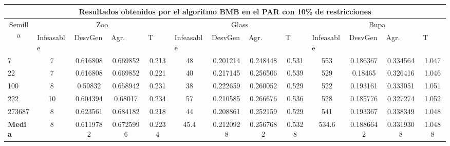 \begin{table}[H]
	\tiny

	\begin{adjustwidth}{-1cm}{-1cm}%
	
	\begin{tabular}{|l|c|c|c|c|c|c|c|c|c|c|c|c|}
	\hline
	\multicolumn{13}{|c|}{\textbf{Resultados obtenidos por el algoritmo BMB en el PAR con 10\% de restricciones}}                                                                                                                                                                                                                                                                                                                                            \\ \hline
	\multicolumn{1}{|c|}{\multirow{2}{*}{Semilla}} & \multicolumn{4}{c|}{Zoo}                                                                                          & \multicolumn{4}{c|}{Glass}                                                                                         & \multicolumn{4}{c|}{Bupa}                                                                                          \\ \cline{2-13} 
	\multicolumn{1}{|c|}{}                                  & \multicolumn{1}{l|}{Infeasable} & \multicolumn{1}{l|}{DesvGen} & \multicolumn{1}{l|}{Agr.} & \multicolumn{1}{l|}{T} & \multicolumn{1}{l|}{Infeasable} & \multicolumn{1}{l|}{DesvGen} & \multicolumn{1}{l|}{Agr.} & \multicolumn{1}{l|}{T} & \multicolumn{1}{l|}{Infeasable} & \multicolumn{1}{l|}{DesvGen} & \multicolumn{1}{l|}{Agr.} & \multicolumn{1}{l|}{T} \\ \hline
	7   	& 7 & 0.616808 & 0.669852 & 0.213 & 				48 & 0.201214 & 0.248448 & 0.531 &			 	553 & 0.186367 & 0.334564 & 1.047		\\ \hline
	22 		& 7 & 0.616808 & 0.669852 & 0.221 &				40 & 0.217145 & 0.256506 & 0.539 &		 		529 & 0.18465 & 0.326416 & 1.046		\\ \hline
	100 	& 8 & 0.59832 & 0.658942 & 0.231 &				38 & 0.222659 & 0.260052 & 0.529 &				522 & 0.193161 & 0.333051 & 1.051			\\ \hline
	222 	& 10 & 0.604394 & 0.68017 & 0.234 &				57 & 0.210585 & 0.266676 & 0.536 &				528 & 0.185776 & 0.327274 & 1.052		\\ \hline
	273687 	& 8 & 0.623561 & 0.684182 & 0.218 &				44 & 0.208861 & 0.252159 & 0.529 &				541 & 0.193367 & 0.338349 & 1.048		\\ \hline
	\textbf{Media} & 8	& 0.6119782	& 0.6725996	& 0.2234	& 45.4	& 0.2120928	& 0.2567682 &	0.5328	& 534.6	& 0.1886642 &	0.3319308 &	1.0488   \\ \hline
	\end{tabular}
	
	\end{adjustwidth}
	
\end{table}

